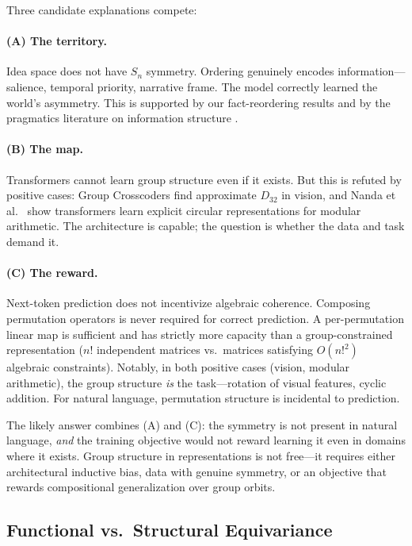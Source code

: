 \documentclass[10pt, letterpaper]{article}
\begin{document}
Three candidate explanations compete:

\paragraph{(A) The territory.} Idea space does not have $S_n$ symmetry. Ordering genuinely encodes information---salience, temporal priority, narrative frame. The model correctly learned the world's asymmetry. This is supported by our fact-reordering results and by the pragmatics literature on information structure \cite{krifka2008, lambrecht1994}.

\paragraph{(B) The map.} Transformers cannot learn group structure even if it exists. But this is refuted by positive cases: Group Crosscoders \cite{gorton2024group} find approximate $D_{32}$ in vision, and Nanda et al.\ \cite{nanda2023grokking} show transformers learn explicit circular representations for modular arithmetic. The architecture is capable; the question is whether the data and task demand it.

\paragraph{(C) The reward.} Next-token prediction does not incentivize algebraic coherence. Composing permutation operators is never required for correct prediction. A per-permutation linear map is sufficient and has strictly more capacity than a group-constrained representation ($n!$ independent matrices vs.\ matrices satisfying $O(n!^2)$ algebraic constraints). Notably, in both positive cases (vision, modular arithmetic), the group structure \emph{is} the task---rotation of visual features, cyclic addition. For natural language, permutation structure is incidental to prediction.

The likely answer combines (A) and (C): the symmetry is not present in natural language, \emph{and} the training objective would not reward learning it even in domains where it exists. Group structure in representations is not free---it requires either architectural inductive bias, data with genuine symmetry, or an objective that rewards compositional generalization over group orbits.

\subsection{Functional vs.\ Structural Equivariance}
\end{document}
